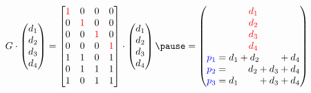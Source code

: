 \begin{frame}{}
  \[
	G \cdot \begin{pmatrix}
      d_1 \\ d_2 \\ d_3 \\ d_4
	\end{pmatrix}
	= \begin{bmatrix}
		\red{1} & 0 & 0 & 0 \\
		0 & \red{1} & 0 & 0 \\
		0 & 0 & \red{1} & 0 \\
		0 & 0 & 0 & \red{1} \\
		1 & 1 & 0 & 1 \\
		0 & 1 & 1 & 1 \\
		1 & 0 & 1 & 1 \\
	\end{bmatrix} 
	\cdot \begin{pmatrix}
      d_1 \\ d_2 \\ d_3 \\ d_4 \\
	\end{pmatrix}
	\pause
	= \begin{pmatrix}
	  \red{d_1} \\ \red{d_2} \\ \red{d_3} \\ \red{d_4} \\
	  \blue{p_1} = d_1 + d_2  \qquad + d_4 \\
	  \blue{p_2} = \qquad d_2 + d_3 + d_4 \\
	  \blue{p_3} = d_1 \qquad + d_3 + d_4 \\
	\end{pmatrix}
  \]

  \pause
  \begin{center}
  \end{center}
\end{frame}

